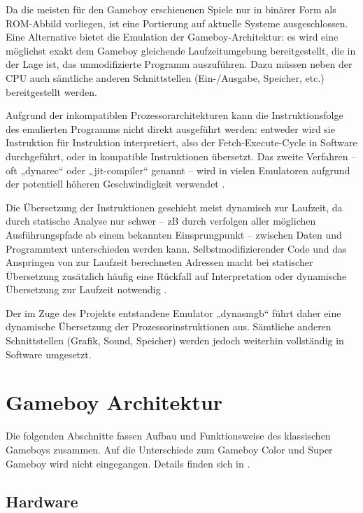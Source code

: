 \documentclass[a4paper]{scrartcl}
\begin{document}
Da die meisten für den Gameboy erschienenen Spiele nur in binärer Form als ROM-Abbild vorliegen, ist eine Portierung auf aktuelle Systeme ausgeschlossen. Eine Alternative bietet die Emulation der Gameboy-Architektur: es wird eine möglichst exakt dem Gameboy gleichende Laufzeitumgebung bereitgestellt, die in der Lage ist, das unmodifizierte Programm auszuführen. Dazu müssen neben der CPU auch sämtliche anderen Schnittstellen (Ein-/Ausgabe, Speicher, etc.) bereitgestellt werden.

Aufgrund der inkompatiblen Prozessorarchitekturen kann die Instruktionsfolge des emulierten Programms nicht direkt ausgeführt werden: entweder wird sie Instruktion für Instruktion interpretiert, also der Fetch-Execute-Cycle in Software durchgeführt, oder in kompatible Instruktionen übersetzt. Das zweite Verfahren -- oft „dynarec“ oder „jit-compiler“ genannt -- wird in vielen Emulatoren aufgrund der potentiell höheren Geschwindigkeit verwendet \cite{pcsx2_introduction}.

Die Übersetzung der Instruktionen geschieht meist dynamisch zur Laufzeit, da durch statische Analyse nur schwer -- zB durch verfolgen aller möglichen Ausführungspfade ab einem bekannten Einsprungpunkt -- zwischen Daten und Programmtext unterschieden werden kann. Selbstmodifizierender Code und das Anspringen von zur Laufzeit berechneten Adressen macht bei statischer Übersetzung zusätzlich häufig eine Rückfall auf Interpretation oder dynamische Übersetzung zur Laufzeit notwendig \cite{nes_recompiler}.

Der im Zuge des Projekts entstandene Emulator „dynasmgb“ führt daher eine dynamische Übersetzung der Prozessorinstruktionen aus. Sämtliche anderen Schnittstellen (Grafik, Sound, Speicher) werden jedoch weiterhin vollständig in Software umgesetzt.

\section{Gameboy Architektur}

Die folgenden Abschnitte fassen Aufbau und Funktionsweise des klassischen Gameboys zusammen. Auf die Unterschiede zum Gameboy Color und Super Gameboy wird nicht eingegangen. Details finden sich in \cite{cpu_manual}\cite{gb_programming_manual}\cite{pandocs}.

\subsection{Hardware}
\end{document}
